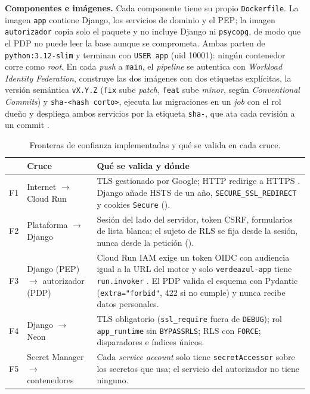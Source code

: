 \documentclass[10pt,letterpaper]{article}
\newcommand{\cod}[1]{\texttt{#1}}
\begin{document}
\textbf{Componentes e imágenes.} Cada componente tiene su propio \cod{Dockerfile}. La imagen \cod{app} contiene Django, los servicios de dominio y el PEP; la imagen \cod{autorizador} copia solo el paquete  y no incluye Django ni \cod{psycopg}, de modo que el PDP no puede leer la base aunque se comprometa. Ambas parten de \cod{python:3.12-slim} y terminan con \cod{USER app} (uid 10001): ningún contenedor corre como \emph{root}. En cada \emph{push} a \cod{main}, el \emph{pipeline} se autentica con \emph{Workload Identity Federation}, construye las dos imágenes con dos etiquetas explícitas, la versión semántica \cod{vX.Y.Z} (\cod{fix} sube \emph{patch}, \cod{feat} sube \emph{minor}, según \emph{Conventional Commits}) y \cod{sha-<hash corto>}, ejecuta las migraciones en un \emph{job} con el rol dueño y despliega ambos servicios por la etiqueta \cod{sha-}, que ata cada revisión a un commit \cite{gcp-ar-tags}.

\begin{table}[ht]
\centering\footnotesize
\caption{Fronteras de confianza implementadas y qué se valida en cada cruce.}
\label{tab:fronteras}
\begin{tabularx}{\linewidth}{@{}lP{3.0cm}Y@{}}
\toprule
& \textbf{Cruce} & \textbf{Qué se valida y dónde}\\
\midrule
F1 & Internet $\rightarrow$ Cloud Run & TLS gestionado por Google; HTTP redirige a HTTPS \cite{gcp-run-https}. Django añade HSTS de un año, \cod{SECURE\_SSL\_REDIRECT} y cookies \cod{Secure} ().\\
F2 & Plataforma $\rightarrow$ Django & Sesión del lado del servidor, token CSRF, formularios de lista blanca; el sujeto de RLS se fija desde la sesión, nunca desde la petición ().\\
F3 & Django (PEP) $\rightarrow$ autorizador (PDP) & Cloud Run IAM exige un token OIDC con audiencia igual a la URL del motor y solo \cod{verdeazul-app} tiene \cod{run.invoker} \cite{gcp-run-s2s}. El PDP valida el esquema con Pydantic (\cod{extra="forbid"}, 422 si no cumple) y nunca recibe datos personales.\\
F4 & Django $\rightarrow$ Neon & TLS obligatorio (\cod{ssl\_require} fuera de \cod{DEBUG}); rol \cod{app\_runtime} sin \cod{BYPASSRLS}; RLS con \cod{FORCE}; disparadores e índices únicos.\\
F5 & Secret Manager $\rightarrow$ contenedores & Cada \emph{service account} solo tiene \cod{secretAccessor} sobre los secretos que usa; el servicio del autorizador no tiene ninguno.\\
\bottomrule
\end{tabularx}
\end{table}
\end{document}
